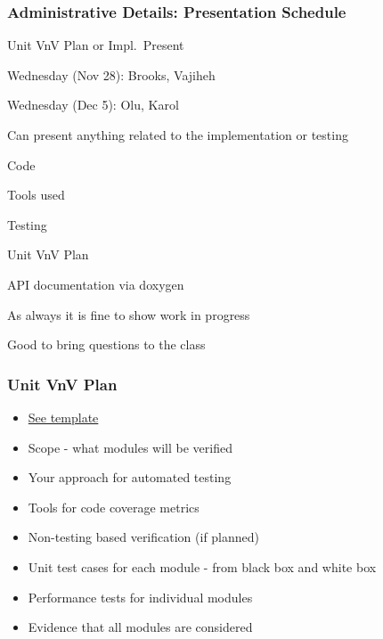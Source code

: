\documentclass[t,12pt,numbers,fleqn]{beamer}
\begin{document}

\begin{frame}
\frametitle{Administrative Details: Presentation Schedule}

\bi
\item Unit VnV Plan or Impl.\ Present
\bi
\item Wednesday (Nov 28): Brooks, Vajiheh
\item Wednesday (Dec 5): Olu, Karol
\ei
\item Can present anything related to the implementation or testing
\bi
\item Code
\item Tools used
\item Testing
\item Unit VnV Plan
\item API documentation via doxygen
\item As always it is fine to show work in progress
\item Good to bring questions to the class
\ei
\ei

\end{frame}






\begin{frame}
\frametitle{Unit VnV Plan}
\begin{itemize}
\item
  \href{https://gitlab.cas.mcmaster.ca/smiths/cas741/blob/master/BlankProjectTemplate/docs/VnVPlan/UnitVnVPlan/}
  {See template}
\item Scope - what modules will be verified
\item Your approach for automated testing
\item Tools for code coverage metrics
\item Non-testing based verification (if planned)
\item Unit test cases for each module - from black box and white box
\item Performance tests for individual modules
  \item Evidence that all modules are considered
\end{itemize}
\end{frame}
\end{document}
